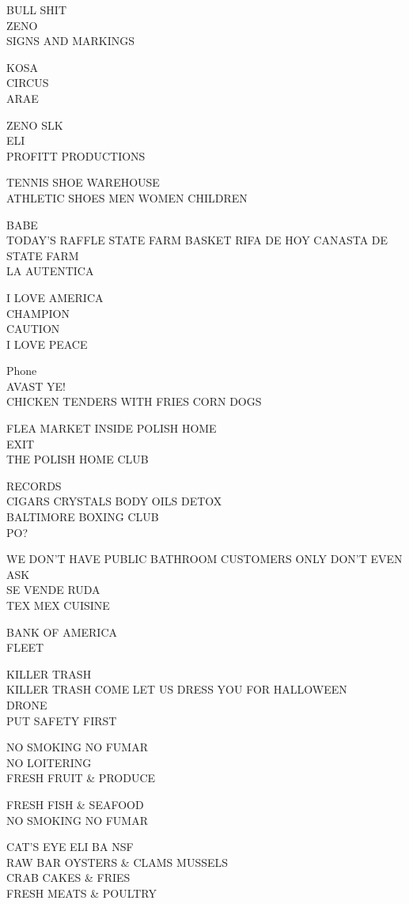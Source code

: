\documentclass[10pt,letterpaper]{article}
\begin{document}
BULL SHIT\\
ZENO\\
SIGNS AND MARKINGS

KOSA\\
CIRCUS\\
ARAE

ZENO SLK\\
ELI\\
PROFITT PRODUCTIONS

TENNIS SHOE WAREHOUSE\\
ATHLETIC SHOES MEN WOMEN CHILDREN

BABE\\
TODAY'S RAFFLE STATE FARM BASKET RIFA DE HOY CANASTA DE STATE FARM\\
LA AUTENTICA

I LOVE AMERICA\\
CHAMPION\\
CAUTION\\
I LOVE PEACE

Phone\\
AVAST YE!\\
CHICKEN TENDERS WITH FRIES CORN DOGS

FLEA MARKET INSIDE POLISH HOME\\
EXIT\\
THE POLISH HOME CLUB

RECORDS\\
CIGARS CRYSTALS BODY OILS DETOX\\
BALTIMORE BOXING CLUB\\
PO?

WE DON'T HAVE PUBLIC BATHROOM CUSTOMERS ONLY DON'T EVEN ASK\\
SE VENDE RUDA\\
TEX MEX CUISINE

BANK OF AMERICA\\
FLEET

KILLER TRASH\\
KILLER TRASH COME LET US DRESS YOU FOR HALLOWEEN\\
DRONE\\
PUT SAFETY FIRST

NO SMOKING NO FUMAR\\
NO LOITERING\\
FRESH FRUIT \& PRODUCE

FRESH FISH \& SEAFOOD\\
NO SMOKING NO FUMAR

CAT'S EYE ELI BA NSF\\
RAW BAR OYSTERS \& CLAMS MUSSELS\\
CRAB CAKES \& FRIES\\
FRESH MEATS \& POULTRY
\end{document}
